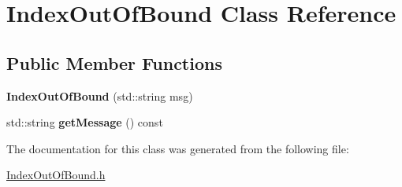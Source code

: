 \hypertarget{class_index_out_of_bound}{\section{Index\-Out\-Of\-Bound Class Reference}
\label{class_index_out_of_bound}
}
\subsection*{Public Member Functions}
\begin{DoxyCompactItemize}
\item 
\hypertarget{class_index_out_of_bound_a139671d1b3d6c7f28bfa56811727f165}{{\bfseries Index\-Out\-Of\-Bound} (std\-::string msg)}\label{class_index_out_of_bound_a139671d1b3d6c7f28bfa56811727f165}

\item 
\hypertarget{class_index_out_of_bound_a8cbbec1f25a774b895a4618e3c416e17}{std\-::string {\bfseries get\-Message} () const }\label{class_index_out_of_bound_a8cbbec1f25a774b895a4618e3c416e17}

\end{DoxyCompactItemize}


The documentation for this class was generated from the following file\-:\begin{DoxyCompactItemize}
\item 
\hyperlink{_index_out_of_bound_8h}{Index\-Out\-Of\-Bound.\-h}\end{DoxyCompactItemize}
